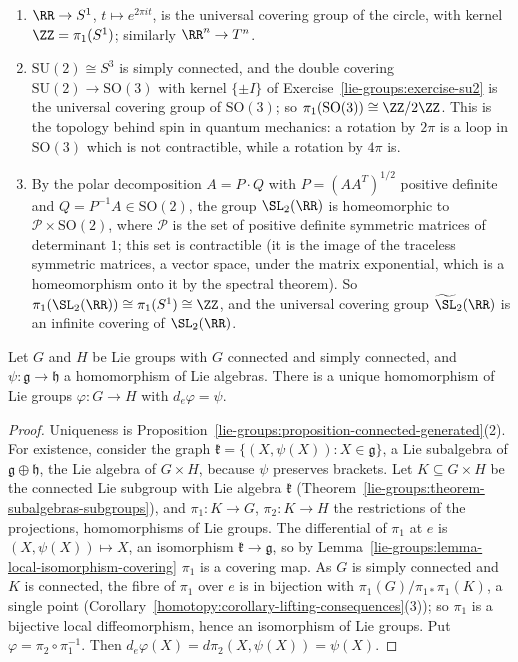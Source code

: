 \begin{example}\label{lie-groups:example-covering-groups}
\begin{enumerate}
\item $\RR \to S^1$, $t \mapsto e^{2\pi it}$, is the universal covering group of the circle, with kernel $\ZZ = \pi_1(S^1)$; similarly $\RR^n \to T^n$.
\item $\mathrm{SU}(2) \cong S^3$ is simply connected, and the double covering $\mathrm{SU}(2) \to \mathrm{SO}(3)$ with kernel $\{\pm I\}$ of
Exercise~\ref{lie-groups:exercise-su2} is the universal covering group of $\mathrm{SO}(3)$; so $\pi_1(\mathrm{SO}(3)) \cong \ZZ/2\ZZ$. This is the topology behind spin in quantum mechanics: a rotation by $2\pi$ is a loop in
$\mathrm{SO}(3)$ which is not contractible, while a rotation by $4\pi$ is.
\item By the polar decomposition $A = P \cdot Q$ with $P = (AA^T)^{1/2}$ positive definite and $Q = P^{-1}A \in \mathrm{SO}(2)$, the group $\SL_2(\RR)$ is homeomorphic
to $\mathcal{P} \times \mathrm{SO}(2)$, where $\mathcal{P}$ is the set of positive definite symmetric matrices of determinant $1$; this set is contractible (it is the
image of the traceless symmetric matrices, a vector space, under the matrix exponential, which is a homeomorphism onto it by the spectral theorem). So
$\pi_1(\SL_2(\RR)) \cong \pi_1(S^1) \cong \ZZ$, and the universal covering group $\widetilde{\SL}_2(\RR)$ is an infinite covering of $\SL_2(\RR)$.
\end{enumerate}
\end{example}

\begin{theorem}\label{lie-groups:theorem-integrate-homomorphisms}
Let $G$ and $H$ be Lie groups with $G$ connected and simply connected, and $\psi \colon \mathfrak{g} \to \mathfrak{h}$ a homomorphism of Lie algebras. There is a unique
homomorphism of Lie groups $\varphi \colon G \to H$ with $d_e\varphi = \psi$.
\end{theorem}

\begin{proof}
Uniqueness is Proposition~\ref{lie-groups:proposition-connected-generated}(2). For existence, consider the graph $\mathfrak{k} = \{(X, \psi(X)) : X \in \mathfrak{g}\}$, a
Lie subalgebra of $\mathfrak{g} \oplus \mathfrak{h}$, the Lie algebra of $G \times H$, because $\psi$ preserves brackets. Let $K \subseteq G \times H$ be the connected Lie
subgroup with Lie algebra $\mathfrak{k}$ (Theorem~\ref{lie-groups:theorem-subalgebras-subgroups}), and $\pi_1 \colon K \to G$, $\pi_2 \colon K \to H$ the restrictions of
the projections, homomorphisms of Lie groups. The differential of $\pi_1$ at $e$ is $(X, \psi(X)) \mapsto X$, an isomorphism $\mathfrak{k} \to \mathfrak{g}$, so by
Lemma~\ref{lie-groups:lemma-local-isomorphism-covering} $\pi_1$ is a covering map. As $G$ is simply connected and $K$ is connected, the fibre of $\pi_1$ over $e$ is in
bijection with $\pi_1(G)/\pi_{1*}\pi_1(K)$, a single point (Corollary~\ref{homotopy:corollary-lifting-consequences}(3)); so $\pi_1$ is a bijective local diffeomorphism,
hence an isomorphism of Lie groups. Put $\varphi = \pi_2 \circ \pi_1^{-1}$. Then $d_e\varphi(X) = d\pi_2(X, \psi(X)) = \psi(X)$.
\end{proof}

